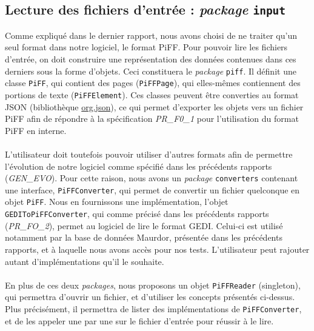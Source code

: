 \subsection{Lecture des fichiers d'entrée : \textit{package} \texttt{input}}

Comme expliqué dans le dernier rapport, nous avons choisi de ne traiter qu'un seul format dans notre logiciel, le format PiFF. Pour pouvoir lire les fichiers d'entrée, on doit construire une représentation des données contenues dans ces derniers sous la forme d'objets. Ceci constituera le \textit{package} \texttt{piff}. Il définit une classe \texttt{PiFF}, qui contient des pages (\texttt{PiFFPage}), qui elles-mêmes contiennent des portions de texte (\texttt{PiFFElement}). Ces classes peuvent être converties au format JSON (bibliothèque \href{https://mvnrepository.com/artifact/org.json/json}{org.json}), ce qui permet d'exporter les objets vers un fichier PiFF afin de répondre à la spécification \textit{PR\_F0\_1} pour l'utilisation du format PiFF en interne.

\paragraph{}
L'utilisateur doit toutefois pouvoir utiliser d'autres formats afin de permettre l'évolution de notre logiciel comme spécifié dans les précédents rapports (\textit{GEN\_EVO}). Pour cette raison, nous avons un \textit{package} \texttt{converters} contenant une interface, \texttt{PiFFConverter}, qui permet de convertir un fichier quelconque en objet \texttt{PiFF}. Nous en fournissons une implémentation, l'objet \texttt{GEDIToPiFFConverter}, qui comme précisé dans les précédents rapports (\textit{PR\_FO\_2}), permet au logiciel de lire le format GEDI. Celui-ci est utilisé notamment par la base de données Maurdor, présentée dans les précédents rapports, et à laquelle nous avons accès pour nos tests. L'utilisateur peut rajouter autant d'implémentations qu'il le souhaite.

\paragraph{}
En plus de ces deux \textit{packages}, nous proposons un objet \texttt{PiFFReader} (singleton), qui permettra d'ouvrir un fichier, et d'utiliser les concepts présentés ci-dessus. Plus précisément, il permettra de lister des implémentations de \texttt{PiFFConverter}, et de les appeler une par une sur le fichier d'entrée pour réussir à le lire.

